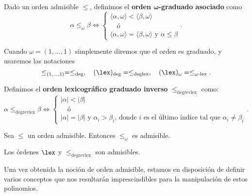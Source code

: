 \begin{definicion}
    Dado un orden admisible $\le$, definimos el \textbf{orden $\boldsymbol{\omega}$-graduado asociado} como
    \begin{equation*}
        \alpha \le_{\omega} \beta \iff \begin{cases}
            \langle \alpha, \omega\rangle  < \langle \beta, \omega\rangle \\
            \quad\text{ó}   \\
           \langle \alpha, \omega\rangle = \langle \beta, \omega\rangle \text{ y } \alpha \le \beta
        \end{cases}.
    \end{equation*}

    Cuando $\omega = (1,\dots, 1)$ simplemente diremos que el orden es graduado, y usaremos las notaciones
    \begin{equation*}
        \le_{(1,\dots,1)} = \le_{\text{deg}},\quad (\lex)_{\text{deg}} = \le_{\text{deglex}},\quad (\lex)_{\omega} = \le_{\omega\text{-lex}}.
    \end{equation*}
\end{definicion}

\begin{definicion}
    Definimos el \textbf{orden lexicográfico graduado inverso} $\le_{\text{degrevlex}}$ como:
    \begin{equation*}
        \alpha \le_{\text{degrevlex}} \beta \iff \begin{cases}
            |\alpha| < |\beta| \\
            \quad\text{ó}   \\
            |\alpha| = |\beta| \text{ y } \alpha_i > \beta_i \text{, donde $i$ es el último índice tal que } \alpha_i \neq \beta_i
        \end{cases}.
    \end{equation*}
\end{definicion}

\begin{proposicion}
    Sea $\le$ un orden admisible. Entonces $\le_{\omega}$ es admisible.
\end{proposicion}
\begin{proposicion}
    Los órdenes $\lex$ y $\le_{\text{degrevlex}}$ son admisibles.
\end{proposicion}

Una vez obtenida la noción de orden admisible, estamos en disposición de definir varios conceptos que nos resultarán imprescindibles para la manipulación de estos polinomios.

